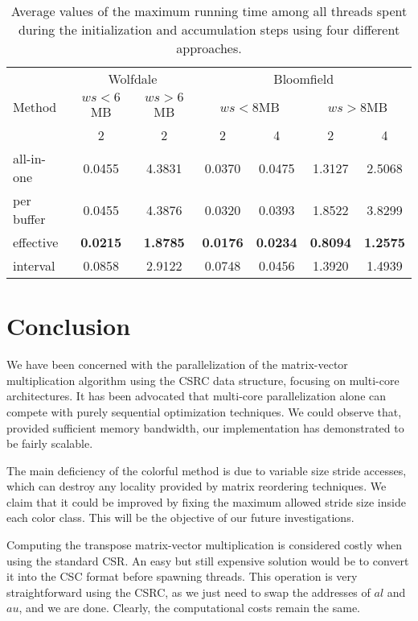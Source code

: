 \documentclass[11pt]{article}
\begin{document}
\begin{table}[t]
\caption{Average values of the maximum running time among all threads spent during the initialization and accumulation steps using four different approaches.}
\label{tab:matvec_bench-acctime}
\centering
\renewcommand{\arraystretch}{1.1}
{\footnotesize
\begin{tabular}{@{}l@{\ \ }c@{\ \ }cc@{\ \ }cc@{\ \ }c@{}}
\toprule
\multirow{3}{*}{Method} & \multicolumn{2}{c}{Wolfdale} & \multicolumn{4}{c}{Bloomfield}\\\cmidrule(r){2-3}\cmidrule(l){4-7}
 & $ws < 6$MB & $ws > 6$MB & \multicolumn{2}{c}{$ws < 8$MB} & \multicolumn{2}{c}{$ws > 8$MB}\\\cmidrule(r){2-2}\cmidrule(r){3-3}\cmidrule(lr){4-5}\cmidrule(l){6-7}
 & 2 & 2 & 2 & 4 & 2 & 4\\
\midrule
all-in-one & 0.0455 & 4.3831 & 0.0370 & 0.0475 & 1.3127 & 2.5068\\
per buffer & 0.0455 & 4.3876 & 0.0320 & 0.0393 & 1.8522 & 3.8299\\
effective  & \textbf{0.0215} & \textbf{1.8785} & \textbf{0.0176} & \textbf{0.0234} & \textbf{0.8094} & \textbf{1.2575}\\
interval  & 0.0858 & 2.9122 & 0.0748 & 0.0456 & 1.3920 & 1.4939\\
\bottomrule
\end{tabular}}
\end{table}

\section{Conclusion}
\label{sec:conclusion}

We have been concerned with the parallelization of the matrix-vector multiplication
algorithm using the CSRC data structure, focusing on multi-core
architectures.  It has been advocated that multi-core parallelization alone can
compete with purely sequential optimization techniques.  We could observe that,
provided sufficient memory bandwidth, our implementation has demonstrated to be fairly scalable.

The main deficiency of the colorful method is due to variable size stride
accesses, which can destroy any locality provided by matrix reordering
techniques.  We claim that it could be improved by fixing the maximum allowed
stride size inside each color class.  This will be the objective of our future
investigations.

Computing the transpose matrix-vector multiplication is
considered costly when using the standard CSR. An easy but still expensive solution
would be to convert it into the CSC format before spawning threads.
This operation is very straightforward using the CSRC,
as we just need to swap the addresses of $al$ and $au$, and we are done.
Clearly, the computational costs remain the same.
\end{document}
